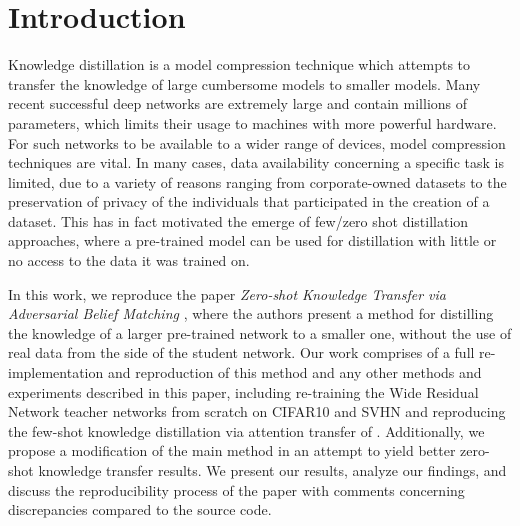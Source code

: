 \section{Introduction}

Knowledge distillation is a model compression technique which attempts to transfer the knowledge of large cumbersome models to smaller models. Many recent successful deep networks are extremely large and contain millions of parameters, which limits their usage to machines with more powerful hardware. For such networks to be available to a wider range of devices, model compression techniques are vital. In many cases, data availability concerning a specific task is limited, due to a variety of reasons ranging from corporate-owned datasets to the preservation of privacy of the individuals that participated in the creation of a dataset. This has in fact motivated the emerge of few/zero shot distillation approaches, where a pre-trained model can be used for distillation with little or no access to the data it was trained on. 

In this work, we reproduce the paper \textit{Zero-shot Knowledge Transfer via Adversarial Belief Matching} \cite{Micaelli2019ZeroShotKT}, where the authors present a method for distilling the knowledge of a larger pre-trained network to a smaller one, without the use of real data from the side of the student network. Our work comprises of a full re-implementation and reproduction of this method and any other methods and experiments described in this paper, including re-training the Wide Residual Network\cite{wrn} teacher networks from scratch on CIFAR10 and SVHN and reproducing the few-shot knowledge distillation via attention transfer of \cite{zagoruyko2016paying}. Additionally, we propose a modification of the main method in an attempt to yield better zero-shot knowledge transfer results. We present our results, analyze our findings, and discuss the reproducibility process of the paper with comments concerning discrepancies compared to the source code. 